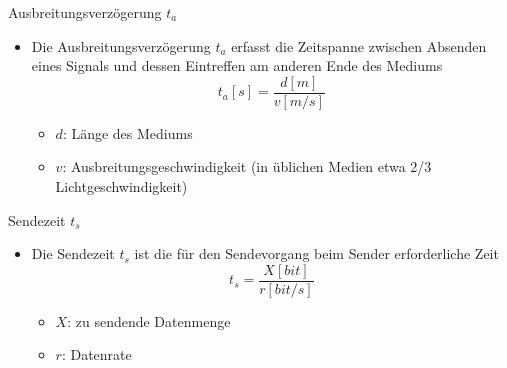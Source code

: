       Ausbreitungsverzögerung $t_a$
      \begin{itemize}
        \item Die Ausbreitungsverzögerung $t_a$ erfasst die Zeitspanne zwischen Absenden eines Signals
          und dessen Eintreffen am anderen Ende des Mediums
          $$t_a[s]=\frac{d[m]}{v[m/s]}$$
          \begin{itemize}
            \item $d$: Länge des Mediums
            \item $v$: Ausbreitungsgeschwindigkeit (in üblichen Medien etwa 2/3 Lichtgeschwindigkeit)
          \end{itemize}
      \end{itemize}
      Sendezeit $t_s$
      \begin{itemize}
        \item Die Sendezeit $t_s$ ist die für den Sendevorgang beim Sender erforderliche Zeit
        $$t_s=\frac{X[bit]}{r[bit/s]}$$
        \begin{itemize}
          \item $X$: zu sendende Datenmenge
          \item $r$: Datenrate
        \end{itemize}
      \end{itemize}
